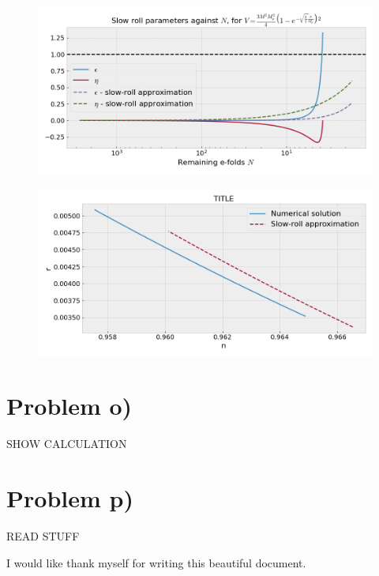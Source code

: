 \documentclass[reprint,english,notitlepage]{revtex4-1}  %
\numberwithin{equation}{section}
\begin{document}
\begin{figure}[h!]
	\includegraphics[width=\linewidth]{StarobinskyPotential_slowroll-N.png}
	\caption{}
	\label{fig:starobinsky_slowroll-N}
\end{figure}


\begin{figure}[h!]
	\includegraphics[width=\linewidth]{StarobinskyPotential_slowroll-nr.png}
	\caption{}
	\label{fig:starobinsky_slowroll-nr}
\end{figure}

\section{Problem o)}
SHOW CALCULATION

\section{Problem p)}
READ STUFF

\begin{acknowledgments}  %
I would like thank myself for writing this beautiful document.
\end{acknowledgments}
\end{document}
